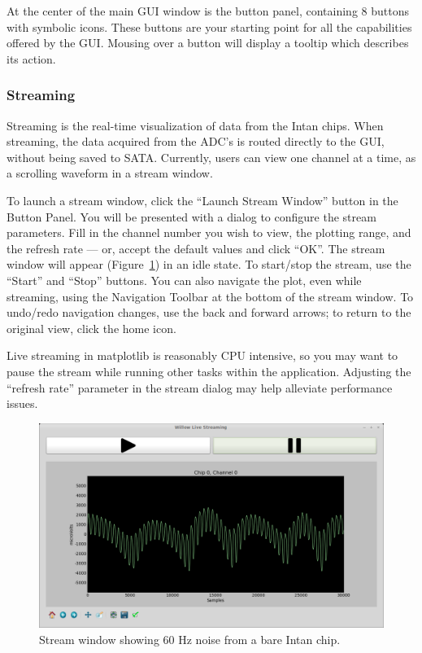 At the center of the main GUI window is the button panel, containing 8 buttons with symbolic icons. These buttons are your starting point for all the capabilities offered by the GUI. Mousing over a button will display a tooltip which describes its action.

\subsubsection{Streaming}
\label{sec_usage_buttonpanel_streaming}

Streaming is the real-time visualization of data from the Intan chips. When streaming, the data acquired from the ADC's is routed directly to the GUI, without being saved to SATA. Currently, users can view one channel at a time, as a scrolling waveform in a stream window.

To launch a stream window, click the ``Launch Stream Window'' button in the Button Panel. You will be presented with a dialog to configure the stream parameters. Fill in the channel number you wish to view, the plotting range, and the refresh rate --- or, accept the default values and click ``OK''. The stream window will appear (Figure~\ref{fig_streamwindow}) in an idle state. To start/stop the stream, use the ``Start'' and ``Stop'' buttons. You can also navigate the plot, even while streaming, using the Navigation Toolbar at the bottom of the stream window. To undo/redo navigation changes, use the back and forward arrows; to return to the original view, click the home icon.

Live streaming in matplotlib is reasonably CPU intensive, so you may want to pause the stream while running other tasks within the application. Adjusting the ``refresh rate'' parameter in the stream dialog may help alleviate performance issues.

\begin{figure}[h!]
\begin{center}
\includegraphics[width=14cm]{screenshots/streamwindow.png}
\end{center}
\caption{Stream window showing 60 Hz noise from a bare Intan chip.}
\label{fig_streamwindow}
\end{figure}

